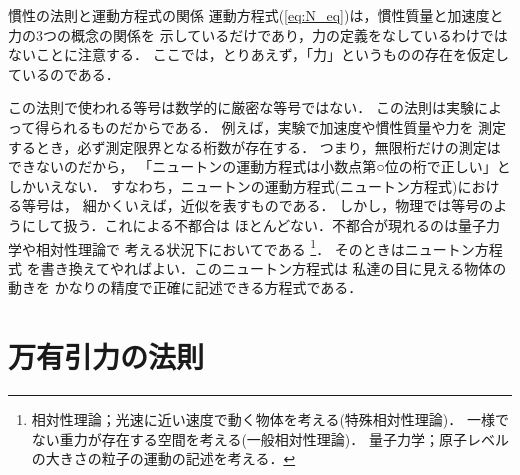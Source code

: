                 \begin{memo}{慣性の法則と運動方程式の関係}
                    運動方程式(\ref{eq:N_eq})は，慣性質量と加速度と力の3つの概念の関係を
                    示しているだけであり，力の定義をなしているわけではないことに注意する．
                    ここでは，とりあえず，「力」というものの存在を仮定しているのである．

                    この法則で使われる等号は数学的に厳密な等号ではない．
                    この法則は実験によって得られるものだからである．
                    例えば，実験で加速度や慣性質量や力を
                    測定するとき，必ず測定限界となる桁数が存在する．
                    つまり，無限桁だけの測定はできないのだから，
                    「ニュートンの運動方程式は小数点第○位の桁で正しい」としかいえない．
                    すなわち，ニュートンの運動方程式(ニュートン方程式)における等号は，
                    細かくいえば，近似を表すものである．
                    しかし，物理では等号のようにして扱う．これによる不都合は
                    ほとんどない．不都合が現れるのは量子力学や相対性理論で
                    考える状況下においてである
                        \footnote{
                            相対性理論；光速に近い速度で動く物体を考える(特殊相対性理論)．
                            一様でない重力が存在する空間を考える(一般相対性理論)．
                            量子力学；原子レベルの大きさの粒子の運動の記述を考える．
                        }．
                    そのときはニュートン方程式
                    を書き換えてやればよい．このニュートン方程式は
                    私達の目に見える物体の動きを
                    かなりの精度で正確に記述できる方程式である．
                \end{memo}



        \section{万有引力の法則}
